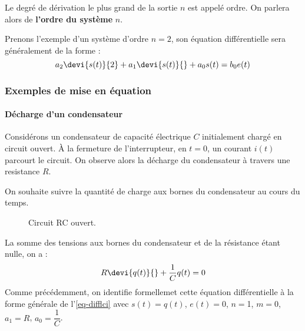 Le degré de dérivation le plus grand de la sortie $n$ est appelé ordre. 
On parlera alors de \textbf{l'ordre du système} $n$.

Prenons l'exemple d'un système d'ordre $n=2$, son équation différentielle 
sera généralement de la forme :
$$
a_2\devi{s(t)}{2}+a_1\devi{s(t)}{}+a_0 s(t)=b_0e(t)
$$

\subsubsection{Exemples de mise en équation}

\paragraph{Décharge d'un condensateur}

Considérons un condensateur de capacité électrique $C$ 
initialement chargé en circuit ouvert.
À la fermeture de l'interrupteur, en $t=0$, 
un courant $i(t)$ parcourt le circuit.
On observe alors la décharge du condensateur à travers une resistance $R$. 

On souhaite suivre la quantité de charge aux bornes du condensateur au 
cours du temps.
\begin{figure}[!h]      
    \centering
    
    \caption{Circuit RC ouvert.\label{fig-decharge_condensateur}}
\end{figure}

La somme des tensions aux bornes du condensateur et de la résistance 
étant nulle, on a :
\begin{align*}
    R\devi{q(t)}{}+\dfrac{1}{C}q(t)=0 
\end{align*}
Comme précédemment, on identifie formellemet cette équation différentielle 
à la forme générale de l'\cref{eq-difflci} avec $s(t)=q(t)$, $e(t)=0$, 
$n=$1, $m=0$, $a_1=R$, $a_0=\dfrac{1}{C}$.

